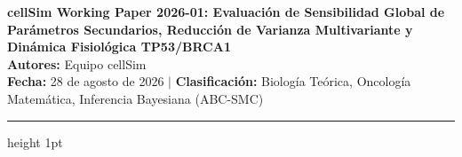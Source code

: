 \documentclass[10pt,a4paper]{article}
\begin{document}
\begin{center}
    {\LARGE \textbf{\color{darkslate} cellSim Working Paper 2026-01: Evaluación de Sensibilidad Global de Parámetros Secundarios, Reducción de Varianza Multivariante y Dinámica Fisiológica TP53/BRCA1}} \\[0.8em]
    {\large \textbf{Autores:} Equipo cellSim} \\[0.3em]
    {\normalsize \textbf{Fecha:} 28 de agosto de 2026 \quad $\vert$ \quad \textbf{Clasificación:} Biología Teórica, Oncología Matemática, Inferencia Bayesiana (ABC-SMC)}
\end{center}

\vspace{0.5em}
\hrule height 1pt
\vspace{1em}
\end{document}

